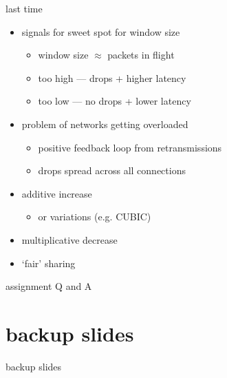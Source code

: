 \date{}
\title{}
\date{}
\usepackage{pgfplots}
\pgfplotsset{compat=1.16}

\begin{frame}
    \titlepage
\end{frame}

\begin{frame}{last time}
    \begin{itemize}
    \item signals for sweet spot for window size
        \begin{itemize}
        \item window size $\approx$ packets in flight
        \item too high --- drops + higher latency
        \item too low --- no drops + lower latency
        \end{itemize}
    \item problem of networks getting overloaded
        \begin{itemize}
        \item positive feedback loop from retransmissions
        \item drops spread across all connections
        \end{itemize}
    \item additive increase
        \begin{itemize}
        \item or variations (e.g. CUBIC)
        \end{itemize}
    \item multiplicative decrease
    \item `fair' sharing
    \end{itemize}
\end{frame}

\begin{frame}{assignment Q and A}
\end{frame}





\section{backup slides}
\begin{frame}{backup slides}
\end{frame}

%



